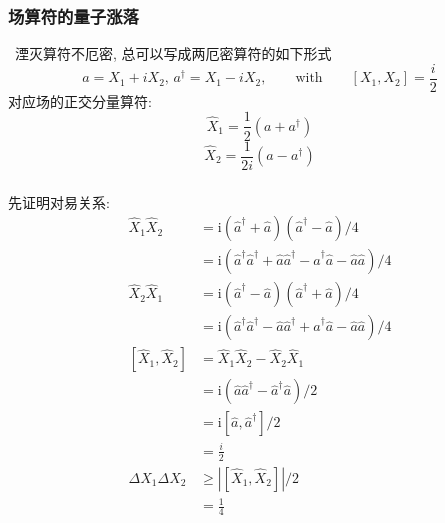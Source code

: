\begin{frame}
 \frametitle{场算符的量子涨落}
 \例[10.试证明所有的相干态都是最小不确定度乘积态]{
   \[ \Delta X_1 \Delta X_2 =\dfrac{1}{4} \] 
  }
 \证~湮灭算符不厄密, 总可以写成两厄密算符的如下形式
 \[ a = X_1 + i X_2, \, a ^\dagger = X_1 - i X_2, \qquad \text{with}\qquad  [X_1, X_2]= \frac{i}{2} \]
 对应场的正交分量算符: 
 \[ \hat{X}_{1} =\frac{1}{2}\left(a + a^{\dagger}\right)\]
 \[ \hat{X}_{2} = \frac{1}{2 i}\left(a - a^{\dagger}\right)\]
\end{frame}


\begin{frame}
 \frametitle{}
      先证明对易关系: 
    \[ \begin{aligned}
        \hat{X}_{1} \hat{X}_{2} & =\mathrm{i}\left(\hat{a}^{\dagger}+\hat{a}\right)\left(\hat{a}^{\dagger}-\hat{a}\right) / 4\\ 
        &=\mathrm{i}\left(\hat{a}^{\dagger} \hat{a}^{\dagger}+\hat{a} \hat{a}^{\dagger}-\hat{a}^{\dagger} \hat{a}-\hat{a} \hat{a}\right) / 4 \\ 
        \hat{X}_{2} \hat{X}_{1} & = \mathrm{i}\left(\hat{a}^{\dagger}-\hat{a}\right)\left(\hat{a}^{\dagger}+\hat{a}\right) / 4 \\ 
        & =\mathrm{i}\left(\hat{a}^{\dagger} \hat{a}^{\dagger}-\hat{a} \hat{a}^{\dagger}+\hat{a}^{\dagger} \hat{a}-\hat{a} \hat{a}\right) / 4 \\ 
        \left[\hat{X}_{1}, \hat{X}_{2}\right] & =\hat{X}_{1} \hat{X}_{2}-\hat{X}_{2} \hat{X}_{1} \\ 
        &= \mathrm{i}\left(\hat{a} \hat{a}^{\dagger}-\hat{a}^{\dagger} \hat{a}\right) / 2 \\ 
        & =\mathrm{i}\left[\hat{a}, \hat{a}^{\dagger}\right] / 2  \\ &=  \frac{i}{2} \\ 
        \Delta X_1 \Delta X_2 & \geq  \left| \left[\hat{X}_{1}, \hat{X}_{2}\right]  \right| /2  \\ 
        &= \frac{1}{4}
    \end{aligned}\]

\end{frame}

